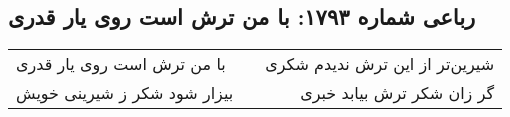 \begin{center}
\section*{رباعی شماره ۱۷۹۳: با من ترش است روی یار قدری}
\label{sec:1793}
\begin{longtable}{l p{0.5cm} r}
با من ترش است روی یار قدری
&&
شیرین‌تر از این ترش ندیدم شکری
\\
بیزار شود شکر ز شیرینی خویش
&&
گر زان شکر ترش بیابد خبری
\\
\end{longtable}
\end{center}
